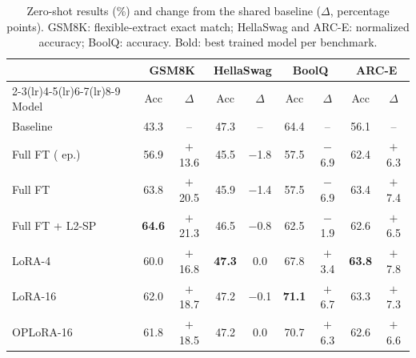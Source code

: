 \begin{table}[t]
\centering
\small
\setlength{\tabcolsep}{4.0pt}
\caption{Zero-shot results (\%) and change from the shared baseline ($\Delta$, percentage points). GSM8K: flexible-extract exact match; HellaSwag and ARC-E: normalized accuracy; BoolQ: accuracy. Bold: best trained model per benchmark.}
\label{tab:bench}
\begin{tabular}{lcccccccc}
\toprule
 & \multicolumn{2}{c}{GSM8K} & \multicolumn{2}{c}{HellaSwag} & \multicolumn{2}{c}{BoolQ} & \multicolumn{2}{c}{ARC-E} \\
\cmidrule(lr){2-3}\cmidrule(lr){4-5}\cmidrule(lr){6-7}\cmidrule(lr){8-9}
Model & Acc & $\Delta$ & Acc & $\Delta$ & Acc & $\Delta$ & Acc & $\Delta$ \\
\midrule
Baseline & 43.3 & -- & 47.3 & -- & 64.4 & -- & 56.1 & -- \\
\midrule
Full FT (\textonehalf{} ep.) & 56.9 & $+$13.6 & 45.5 & $-$1.8 & 57.5 & $-$6.9 & 62.4 & $+$6.3 \\
\addlinespace[1pt]
Full FT & 63.8 & $+$20.5 & 45.9 & $-$1.4 & 57.5 & $-$6.9 & 63.4 & $+$7.4 \\
Full FT + L2-SP & \textbf{64.6} & $+$21.3 & 46.5 & $-$0.8 & 62.5 & $-$1.9 & 62.6 & $+$6.5 \\
\addlinespace[1pt]
LoRA-4 & 60.0 & $+$16.8 & \textbf{47.3} & 0.0 & 67.8 & $+$3.4 & \textbf{63.8} & $+$7.8 \\
LoRA-16 & 62.0 & $+$18.7 & 47.2 & $-$0.1 & \textbf{71.1} & $+$6.7 & 63.3 & $+$7.3 \\
OPLoRA-16 & 61.8 & $+$18.5 & 47.2 & 0.0 & 70.7 & $+$6.3 & 62.6 & $+$6.6 \\
\bottomrule
\end{tabular}
\end{table}
